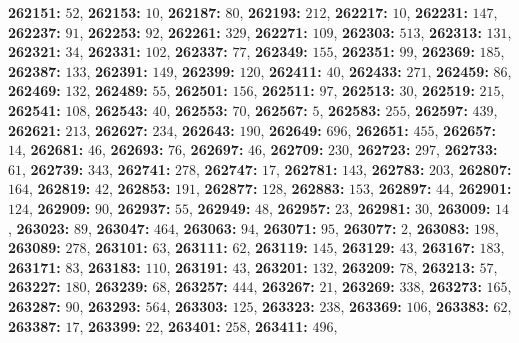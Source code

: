 \textsf{\bfseries 262151:} $52$, \textsf{\bfseries 262153:} $10$, \textsf{\bfseries 262187:} $80$, \textsf{\bfseries 262193:} $212$, \textsf{\bfseries 262217:} $10$, \textsf{\bfseries 262231:} $147$, \textsf{\bfseries 262237:} $91$, \textsf{\bfseries 262253:} $92$, \textsf{\bfseries 262261:} $329$, \textsf{\bfseries 262271:} $109$, \textsf{\bfseries 262303:} $513$, \textsf{\bfseries 262313:} $131$, \textsf{\bfseries 262321:} $34$, \textsf{\bfseries 262331:} $102$, \textsf{\bfseries 262337:} $77$, \textsf{\bfseries 262349:} $155$, \textsf{\bfseries 262351:} $99$, \textsf{\bfseries 262369:} $185$, \textsf{\bfseries 262387:} $133$, \textsf{\bfseries 262391:} $149$, \textsf{\bfseries 262399:} $120$, \textsf{\bfseries 262411:} $40$, \textsf{\bfseries 262433:} $271$, \textsf{\bfseries 262459:} $86$, \textsf{\bfseries 262469:} $132$, \textsf{\bfseries 262489:} $55$, \textsf{\bfseries 262501:} $156$, \textsf{\bfseries 262511:} $97$, \textsf{\bfseries 262513:} $30$, \textsf{\bfseries 262519:} $215$, \textsf{\bfseries 262541:} $108$, \textsf{\bfseries 262543:} $40$, \textsf{\bfseries 262553:} $70$, \textsf{\bfseries 262567:} $5$, \textsf{\bfseries 262583:} $255$, \textsf{\bfseries 262597:} $439$, \textsf{\bfseries 262621:} $213$, \textsf{\bfseries 262627:} $234$, \textsf{\bfseries 262643:} $190$, \textsf{\bfseries 262649:} $696$, \textsf{\bfseries 262651:} $455$, \textsf{\bfseries 262657:} $14$, \textsf{\bfseries 262681:} $46$, \textsf{\bfseries 262693:} $76$, \textsf{\bfseries 262697:} $46$, \textsf{\bfseries 262709:} $230$, \textsf{\bfseries 262723:} $297$, \textsf{\bfseries 262733:} $61$, \textsf{\bfseries 262739:} $343$, \textsf{\bfseries 262741:} $278$, \textsf{\bfseries 262747:} $17$, \textsf{\bfseries 262781:} $143$, \textsf{\bfseries 262783:} $203$, \textsf{\bfseries 262807:} $164$, \textsf{\bfseries 262819:} $42$, \textsf{\bfseries 262853:} $191$, \textsf{\bfseries 262877:} $128$, \textsf{\bfseries 262883:} $153$, \textsf{\bfseries 262897:} $44$, \textsf{\bfseries 262901:} $124$, \textsf{\bfseries 262909:} $90$, \textsf{\bfseries 262937:} $55$, \textsf{\bfseries 262949:} $48$, \textsf{\bfseries 262957:} $23$, \textsf{\bfseries 262981:} $30$, \textsf{\bfseries 263009:} $14$, \textsf{\bfseries 263023:} $89$, \textsf{\bfseries 263047:} $464$, \textsf{\bfseries 263063:} $94$, \textsf{\bfseries 263071:} $95$, \textsf{\bfseries 263077:} $2$, \textsf{\bfseries 263083:} $198$, \textsf{\bfseries 263089:} $278$, \textsf{\bfseries 263101:} $63$, \textsf{\bfseries 263111:} $62$, \textsf{\bfseries 263119:} $145$, \textsf{\bfseries 263129:} $43$, \textsf{\bfseries 263167:} $183$, \textsf{\bfseries 263171:} $83$, \textsf{\bfseries 263183:} $110$, \textsf{\bfseries 263191:} $43$, \textsf{\bfseries 263201:} $132$, \textsf{\bfseries 263209:} $78$, \textsf{\bfseries 263213:} $57$, \textsf{\bfseries 263227:} $180$, \textsf{\bfseries 263239:} $68$, \textsf{\bfseries 263257:} $444$, \textsf{\bfseries 263267:} $21$, \textsf{\bfseries 263269:} $338$, \textsf{\bfseries 263273:} $165$, \textsf{\bfseries 263287:} $90$, \textsf{\bfseries 263293:} $564$, \textsf{\bfseries 263303:} $125$, \textsf{\bfseries 263323:} $238$, \textsf{\bfseries 263369:} $106$, \textsf{\bfseries 263383:} $62$, \textsf{\bfseries 263387:} $17$, \textsf{\bfseries 263399:} $22$, \textsf{\bfseries 263401:} $258$, \textsf{\bfseries 263411:} $496$, 
